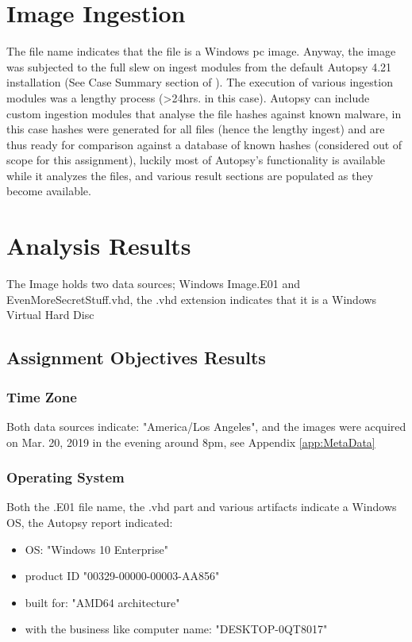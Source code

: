 \documentclass[
	letterpaper, %
	10pt, %
	unnumberedsections, %
	twoside, %
]{APAAssignment}
\begin{document}
\section{Image Ingestion}
The file name indicates that the file is a Windows pc image. Anyway, the image was subjected to the full slew on ingest modules from the default Autopsy 4.21 installation (See Case Summary section of \cite{AutoReport}). The execution of various ingestion modules was a lengthy process (>24hrs. in this case). Autopsy can include custom ingestion modules that analyse the file hashes against known malware, in this case hashes were generated for all files (hence the lengthy ingest) and are thus ready for comparison against a database of known hashes (considered out of scope for this assignment), luckily most of Autopsy's functionality is available while it analyzes the files, and various result sections are populated as they become available.

\section{Analysis Results}
The Image holds two data sources; Windows Image.E01 and EvenMoreSecretStuff.vhd, the .vhd extension indicates that it is a Windows Virtual Hard Disc \cite{WindowsVHD}
\subsection{Assignment Objectives Results}

\subsubsection{Time Zone}
Both data sources indicate: "America/Los Angeles", and the images were acquired on Mar. 20, 2019 in the evening around 8pm, see Appendix \ref{app:MetaData}

\subsubsection{Operating System}
Both the .E01 file name, the .vhd part and various artifacts indicate a Windows OS, the Autopsy report \cite{AutoReport} indicated:

\begin{itemize}
	\item OS: "Windows 10 Enterprise"
	\item product ID "00329-00000-00003-AA856"
	\item built for: "AMD64 architecture"
	\item with the business like computer name: "DESKTOP-0QT8017"
\end{itemize}
\end{document}
